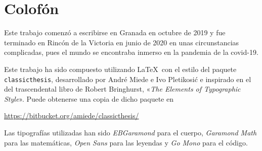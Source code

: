 \pagestyle{empty}

\hfill

\vfill


\section*{Colofón}
Este trabajo comenzó a escribirse en Granada en octubre de 2019 y fue terminado en Rincón de la Victoria en junio de 2020 en unas circunstancias complicadas, pues el mundo se encontraba inmerso en la pandemia de la covid-19.

Este trabajo ha sido compuesto utilizando \LaTeX\ con el estilo del paquete \texttt{classicthesis}, desarrollado por André Miede e Ivo Pletikosić e inspirado en el del trascendental libro de Robert Bringhurst, «\emph{The Elements of Typographic Style}».
Puede obtenerse una copia de dicho paquete en
\begin{center}
\url{https://bitbucket.org/amiede/classicthesis/}
\end{center}
Las tipografías utilizadas han sido \emph{EBGaramond} para el cuerpo, \emph{Garamond Math} para las matemáticas, \emph{Open Sans} para las leyendas y \emph{Go Mono} para el código.
\bigskip
